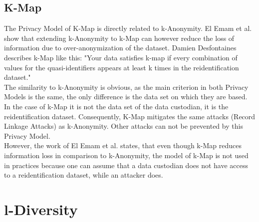 \documentclass[12pt, a4paper,oneside]{report}
\begin{document}
\subsection{K-Map}\label{k-map}
The Privacy Model of K-Map is directly related to k-Anonymity. El Emam et al. show that extending k-Anonymity to k-Map can however reduce the loss of information due to over-anonymization of the dataset\cite{Emam2008}. Damien Desfontaines describes k-Map like this: "Your data satisfies k-map if every combination of values for the quasi-identifiers appears at least k times in the reidentification dataset."\cite{desfontaines}\\
The similarity to k-Anonymity is obvious, as the main criterion in both Privacy Models is the same, the only difference is the data set on which they are based. In the case of k-Map it is not the data set of the data custodian, it is the reidentification dataset\cite{desfontaines}. Consequently, K-Map mitigates the same attacks (Record Linkage Attacks) as k-Anonymity. Other attacks can not be prevented by this Privacy Model.\\
However, the work of El Emam et al. states, that even though k-Map reduces information loss in comparison to k-Anonymity, the model of k-Map is not used in practices because one can assume that a data custodian does not have access to a reidentification dataset, while an attacker does\cite{Emam2008}.  

\section{l-Diversity}
\end{document}

